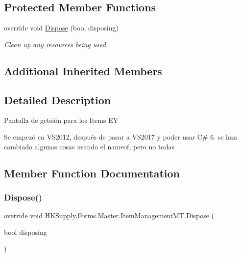\subsection*{Protected Member Functions}
\begin{DoxyCompactItemize}
\item 
override void \mbox{\hyperlink{class_h_k_supply_1_1_forms_1_1_master_1_1_item_management_m_t_ab10a6ef448904a2aff48b9e8e731a577}{Dispose}} (bool disposing)
\begin{DoxyCompactList}\small\item\em Clean up any resources being used. \end{DoxyCompactList}\end{DoxyCompactItemize}
\subsection*{Additional Inherited Members}


\subsection{Detailed Description}
Pantalla de getsión para los Items EY 

Se empezó en V\+S2012, después de pasar a V\+S2017 y poder usar C\# 6. se han cambiado algunas cosas usando el nameof, pero no todas

\subsection{Member Function Documentation}
\mbox{\label{class_h_k_supply_1_1_forms_1_1_master_1_1_item_management_m_t_ab10a6ef448904a2aff48b9e8e731a577}} 
\subsubsection{\texorpdfstring{Dispose()}{Dispose()}}
{\footnotesize\ttfamily override void H\+K\+Supply.\+Forms.\+Master.\+Item\+Management\+M\+T.\+Dispose (\begin{DoxyParamCaption}\item[{bool}]{disposing }\end{DoxyParamCaption})\hspace{0.3cm}{\ttfamily [protected]}}



